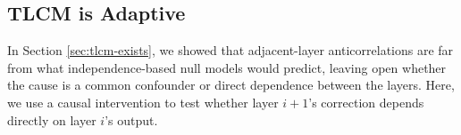 


\subsection{TLCM is Adaptive}
\label{sec:tlcm-adaptive}



In Section \ref{sec:tlcm-exists}, we showed that adjacent-layer anticorrelations are far from what independence-based null models would predict, leaving open whether the cause is a common confounder or direct dependence between the layers.
Here, we use a causal intervention to test whether layer $i+1$'s correction depends directly on layer $i$'s output.



